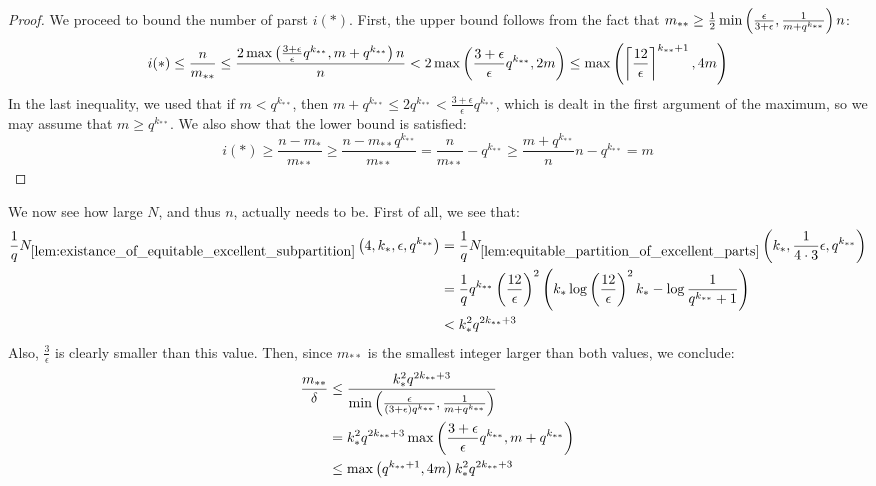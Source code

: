 \begin{theorem}[Theorem 5.18]
\begin{proof}
            We proceed to bound the number of parst $i(*)$.
            First, the upper bound follows from the fact that
            $m_{**} \geq \frac{1}{2} \min \left( \frac{\epsilon} {3 + \epsilon}, \frac{1}{m + q^{k_{**}}} \right) n$:
            \[
                i(*) \leq \frac{n}{m_{**}} \leq \frac{2 \max \left( \frac{3 + \epsilon}{\epsilon} q^{k_{**}}, m + q^{k_{**}} \right)n}{n}
                     < 2 \max \left( \frac{3 + \epsilon}{\epsilon} q^{k_{**}}, 2m \right)
                     \leq \max \left( \left\lceil \frac{12}{\epsilon} \right\rceil^{k_{**}+1}, 4m \right)
            \]
            In the last inequality, we used that if $m < q^{k_{**}}$, then $m + q^{k_{**}} \leq 2q^{k_{**}} < \frac{3 + \epsilon}{\epsilon} q^{k_{**}}$,
            which is dealt in the first argument of the maximum, so we may assume that $m \geq q^{k_{**}}$.
            We also show that the lower bound is satisfied:
            \[
                i(*) \geq \frac{n - m_*}{m_{**}}
                     \geq \frac{n - m_{**}q^{k_{**}}}{m_{**}}
                     = \frac{n}{m_{**}} - q^{k_{**}}
                     \geq \frac{m + q^{k_{**}}}{n} n - q^{k_{**}}
                     = m
            \]
        \end{proof}
    \end{theorem}

    \begin{remark}
        We now see how large $N$, and thus $n$, actually needs to be.
        First of all, we see that:
        \begin{align*}
            \frac{1}{q} N_{\ref{lem:existance_of_equitable_excellent_subpartition}}\left( 4, k_*, \epsilon, q^{k_{**}} \right)
                & = \frac{1}{q} N_{\ref{lem:equitable_partition_of_excellent_parts}}\left( k_*, \frac{1}{4 \cdot 3} \epsilon, q^{k_{**}} \right) \\
                & = \frac{1}{q} q^{k_{**}} \left( \frac{12}{\epsilon} \right)^2
                    \left( k_* \log{\left( \frac{12}{\epsilon} \right)^2 k_*} - \log{\frac{1}{q^{k_{**}}+1}} \right) \\
                & < k_*^2 q^{2 k_{**} + 3}
        \end{align*}
        Also, $\frac{3}{\epsilon}$ is clearly smaller than this value.
        Then, since $m_{**}$ is the smallest integer larger than both values, we conclude:
        \begin{align*}
            \frac{m_{**}}{\delta}
                & \leq \frac{k_*^2 q^{2 k_{**} + 3}}
                    {\min \left( \frac{\epsilon}{\left( 3 + \epsilon \right) q^{k_{**}}}, \frac{1}{m + q^{k_{**}}} \right)} \\
                & = k_*^2 q^{2 k_{**} + 3} \max \left( \frac{3 + \epsilon}{\epsilon} q^{k_{**}}, m + q^{k_{**}} \right) \\
                & \leq \max \left( q^{k_{**} + 1}, 4m \right) k_*^2 q^{2 k_{**} + 3}
        \end{align*}
    \end{remark}

